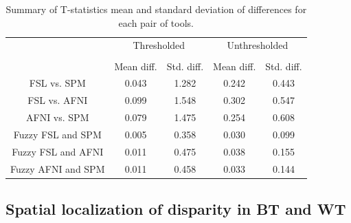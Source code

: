 \documentclass[runningheads]{llncs}
\begin{document}
\setlength{\tabcolsep}{10pt}
\begin{table}[h]
    \centering
    \begin{tabular}{ccc|cc}
        \toprule
        \multirow{2}{*}{} & \multicolumn{2}{c}{Thresholded} & \multicolumn{2}{c}{Unthresholded} \\
        \cmidrule{2-3} \cmidrule{4-5} \\
        {} & Mean diff. & Std. diff. & Mean diff. & Std. diff. \\
        \midrule
        \rowcolor{lightgray}
        FSL vs. SPM          &  0.043       & 1.282      & 0.242     & 0.443  \\
        \rowcolor{lightgray}
        FSL vs. AFNI         &  0.099       & 1.548      & 0.302     & 0.547  \\
        \rowcolor{lightgray}
        AFNI vs. SPM         &  0.079       & 1.475      & 0.254     & 0.608  \\
        Fuzzy FSL and SPM    &  0.005       & 0.358      & 0.030     & 0.099  \\
        Fuzzy FSL and AFNI   &  0.011       & 0.475      & 0.038     & 0.155  \\
        Fuzzy AFNI and SPM   &  0.011       & 0.458      & 0.033     & 0.144  \\
        \bottomrule
    \end{tabular}
    \caption{Summary of T-statistics mean and standard deviation of differences for each pair of tools.}
    \label{table:pipeline-stats}
\end{table}


\subsection{Spatial localization of disparity in BT and WT}
\end{document}
